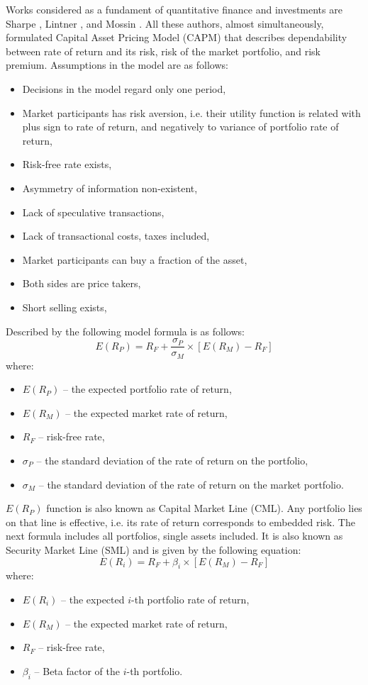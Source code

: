 \documentclass{pracamgr_wne}\usepackage[]{graphicx}\usepackage[]{color}
\begin{document}
Works considered as a fundament of quantitative finance and investments are Sharpe \cite{Sharpe1964}, Lintner \cite{Lintner1965}, and Mossin \cite{Mossin1966}. All these authors, almost simultaneously, formulated Capital Asset Pricing Model (CAPM) that describes dependability between rate of return and its risk, risk of the market portfolio, and risk premium.
Assumptions in the model are as follows:
\begin{itemize}
\item Decisions in the model regard only one period,
\item Market participants has risk aversion, i.e. their utility function is related with plus sign to rate of return, and negatively to variance of portfolio rate of return,
\item Risk-free rate exists,
\item Asymmetry of information non-existent,
\item Lack of speculative transactions,
\item Lack of transactional costs, taxes included,
\item Market participants can buy a fraction of the asset,
\item Both sides are price takers,
\item Short selling exists,
\end{itemize}
Described by the following model formula is as follows:
\begin{equation}
E(R_P)=R_F+\frac{\sigma_P}{\sigma_M}\times[E(R_M)-R_F]
\end{equation}
where:
\begin{itemize}
\item $E(R_P )$ -- the expected portfolio rate of return,
\item $E(R_M)$ -- the expected market rate of return,
\item $R_F$ -- risk-free rate,
\item $\sigma_P$ -- the standard deviation of the rate of return on the portfolio,
\item $\sigma_M$ -- the standard deviation of the rate of return on the market portfolio.
\end{itemize}
$E(R_P)$ function is also known as Capital Market Line (CML). Any portfolio lies on that line is effective, i.e. its rate of return corresponds to embedded risk.
The next formula includes all portfolios, single assets included. It is also known as Security Market Line (SML) and is given by the following equation:
\begin{equation} \label{eq:erl}
E(R_i)=R_F+\beta_i\times[E(R_M)-R_F]
\end{equation}
where:
\begin{itemize}
\item $E(R_i)$ -- the expected $i$-th portfolio rate of return,
\item $E(R_M)$ -- the expected market rate of return,
\item $R_F$ -- risk-free rate,
\item $\beta_i$ -- Beta factor of the $i$-th portfolio.
\end{itemize}
\end{document}
